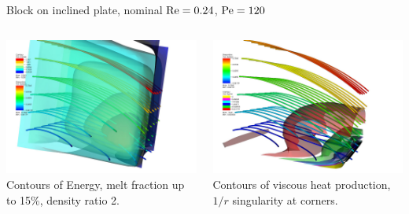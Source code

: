 \begin{frame}{Block on inclined plate, nominal ${\mathrm{Re}} = 0.24$, ${\mathrm{Pe}} = 120$}
  \begin{columns}
    \begin{column}{0.5\textwidth}
      \includegraphics[width=1.3\textwidth]{figures/VHTNondimEnergy} \\
      Contours of Energy, melt fraction up to 15\%, density ratio 2.
    \end{column}
    \begin{column}{0.5\textwidth}
      \includegraphics[width=1.3\textwidth]{figures/VHTNondimSigma} \\
      Contours of viscous heat production, $1/r$ singularity at corners.
    \end{column}
  \end{columns}
\end{frame}
